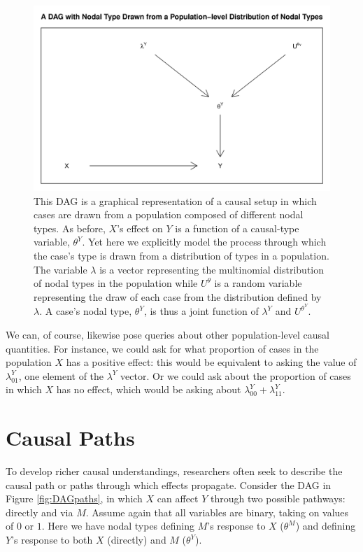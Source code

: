 \documentclass[
  12pt,
]{book}
\begin{document}
\begin{figure}

{\centering \includegraphics[width=0.6\linewidth]{ii_files/figure-latex/DAGace-1} 

}

\caption{\label{fig:DAGace} This DAG is a graphical representation of a causal setup in which cases are drawn from a population composed of different nodal types. As before, $X$'s effect on $Y$ is a function of a causal-type variable, $\theta^Y$. Yet here we explicitly model the process through which the case's type is drawn from a distribution of types in a population. The variable $\lambda$ is a vector representing the multinomial distribution of nodal types in the population while $U^\theta$ is a random variable representing the draw of each case from the distribution defined by $\lambda$. A case's nodal type, $\theta^Y$, is thus a joint function of $\lambda^Y$ and $U^{\theta^Y}$.}\label{fig:DAGace}
\end{figure}

We can, of course, likewise pose queries about other population-level causal quantities. For instance, we could ask for what proportion of cases in the population \(X\) has a positive effect: this would be equivalent to asking the value of \(\lambda^Y_{01}\), one element of the \(\lambda^Y\) vector. Or we could ask about the proportion of cases in which \(X\) has no effect, which would be asking about \(\lambda^Y_{00} + \lambda^Y_{11}\).

\hypertarget{causal-paths}{%
\section{Causal Paths}\label{causal-paths}}

To develop richer causal understandings, researchers often seek to describe the causal path or paths through which effects propagate. Consider the DAG in Figure \ref{fig:DAGpaths}, in which \(X\) can affect \(Y\) through two possible pathways: directly and via \(M\). Assume again that all variables are binary, taking on values of \(0\) or \(1\). Here we have nodal types defining \(M\)'s response to \(X\) (\(\theta^M\)) and defining \(Y\)'s response to both \(X\) (directly) and \(M\) (\(\theta^Y\)).
\end{document}
